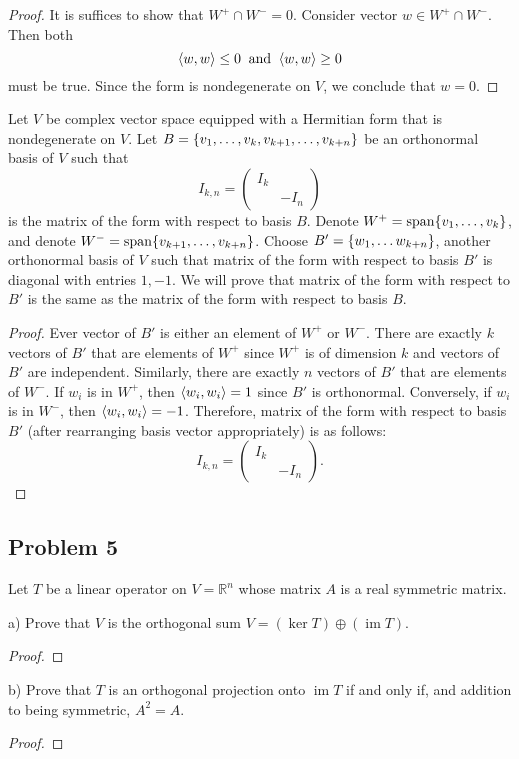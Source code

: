 \documentclass{article}
\theoremstyle{definition}
\DeclareMathOperator{\im}{\operatorname{im}}
\DeclareMathOperator{\spn}{\operatorname{span}}
\newcommand{\R}{\mathbb{R}}
\DeclarePairedDelimiter\set{\{}{\}}
\DeclarePairedDelimiter\bilform{\langle}{\rangle}
\begin{document}
\begin{proof}

It is suffices to show that $W^+ \cap W^- = 0$.
Consider vector $w \in W^+ \cap W^-$.
Then both
\[
    \bilform{w,w} \leq 0
    \> \text{ and } \>
    \bilform{w,w} \geq 0
\]
must be true.
Since the form is nondegenerate on $V$, we conclude that $w = 0$.

\end{proof}

Let $V$ be complex vector space equipped with a Hermitian form that is nondegenerate on $V$.
Let $B = \set{ v_1, \dots, v_k, v_{k+1}, \dots, v_{k+n} }$ be an orthonormal basis of $V$ such that
\[
    I_{k, n} =
    \begin{pmatrix}
        I_k & \\
        & -I_n
    \end{pmatrix}
\]
is the matrix of the form with respect to basis $B$.
Denote $W^+ = \spn \set{v_1, \dots, v_k}$, and denote $W^- = \spn \set{v_{k+1}, \dots, v_{k+n}}$.
Choose $B' = \set{ w_1, \dots w_{k+n} }$, another orthonormal basis of $V$ such that matrix of the form with respect to basis $B'$ is diagonal with entries $1, -1$.
We will prove that matrix of the form with respect to $B'$ is the same as the matrix of the form with respect to basis $B$.

\begin{proof}

Ever vector of $B'$ is either an element of $W^+$ or $W^-$.
There are exactly $k$ vectors of $B'$ that are elements of $W^+$ since $W^+$ is of dimension $k$ and vectors of $B'$ are independent.
Similarly, there are exactly $n$ vectors of $B'$ that are elements of $W^-$.
If $w_i$ is in $W^+$, then $\bilform{w_i, w_i} = 1$ since $B'$ is orthonormal.
Conversely, if $w_i$ is in $W^-$, then $\bilform{w_i, w_i} = -1$.
Therefore, matrix of the form with respect to basis $B'$ (after rearranging basis vector appropriately) is as follows: 
\[
    I_{k, n} =
    \begin{pmatrix}
        I_k & \\
        & -I_n
    \end{pmatrix}.
\]

\end{proof}


\subsection*{Problem 5}

\begin{tcolorbox}
Let $T$ be a linear operator on $V = \R^n$ whose matrix $A$ is a real symmetric matrix.

a) Prove that $V$ is the orthogonal sum $V = (\ker T) \oplus (\im T)$.
\end{tcolorbox}
\begin{proof}
\end{proof}

\begin{tcolorbox}
b) Prove that $T$ is an orthogonal projection onto $\im T$ if and only if, and addition to being symmetric, $A^2=A$.
\end{tcolorbox}
\begin{proof}
\end{proof}
\end{document}
